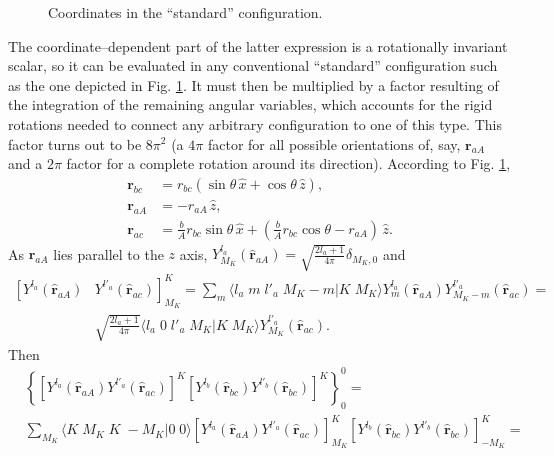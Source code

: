 \begin{subappendices}
\begin{figure}
\vspace{-3cm}
\caption{Coordinates in the ``standard'' configuration.}\label{figC6AppF2}
\end{figure}
The coordinate--dependent part of the latter expression is  a rotationally invariant scalar, so it can be evaluated in any conventional ``standard'' configuration such as the one depicted in Fig. \ref{figC6AppF2}. It must then be multiplied by a factor resulting of the integration of the remaining angular variables, which accounts for the rigid rotations needed to connect any arbitrary configuration to one of this type. This factor turns out to be $8\pi^2$ (a $4\pi$ factor for all possible orientations of, say, $\mathbf r_{aA}$ and a $2\pi$ factor for a complete rotation around its direction). According to Fig. \ref{figC6AppF2},
\begin{equation}\label{eqC6AppF22}
\begin{split}
\mathbf{r}_{bc}&=r_{bc}\left(\sin \theta\, \hat x+\cos \theta\,\hat z \right),\\
\mathbf{r}_{aA}&=-r_{aA}\,\hat z,\\
\mathbf{r}_{ac}&=\frac{b}{A}r_{bc}\sin \theta\,\hat x+\left(\frac{b}{A}r_{bc}\cos \theta-r_{aA}\right)\,\hat z.
\end{split}
\end{equation}
As $\mathbf{r}_{aA}$ lies parallel to the $z$ axis, $Y^{l_a}_{M_K} (\hat{\mathbf r}_{aA})=\sqrt{\frac{2l_a+1}{4\pi}}\delta_{M_K,0}$ and
\begin{equation}\label{eqC6AppG22}
\begin{split}
\left[ Y^{l_a} (\hat{\mathbf r}_{aA})\right.&\left. Y^{l'_a} (\hat{ \mathbf r}_{ac})\right]^K_{M_K}=\sum_{m}\langle l_a\;m\;l'_a\;M_K-m|K\;M_K\rangle Y^{l_a}_{m} (\hat{ \mathbf r}_{aA})Y^{l'_a}_{M_K-m} (\hat{ \mathbf r}_{ac})=\\
&\sqrt{\frac{2l_a+1}{4\pi}} \langle l_a\;0\;l'_a\;M_K|K\;M_K\rangle Y^{l'_a}_{M_K} (\hat{ \mathbf r}_{ac}).
\end{split}
\end{equation}
Then
\begin{equation}\label{eqC6AppG23}
\begin{split}
&\left\{\left[ Y^{l_a} (\hat{\mathbf r}_{aA}) Y^{l'_a} (\hat{ \mathbf r}_{ac})\right]^K\left[ Y^{l_b} (\hat{\mathbf r}_{bc}) Y^{l'_b} (\hat{\mathbf r}_{bc})\right]^{K} \right\}^0_0=\\
&\sum_{M_K}\langle K\;M_K\;K\;-M_K|0\;0\rangle \left[ Y^{l_a} (\hat{\mathbf r}_{aA}) Y^{l'_a} (\hat{ \mathbf r}_{ac})\right]^K_{M_K}\left[ Y^{l_b} (\hat{\mathbf r}_{bc}) Y^{l'_b} (\hat{\mathbf r}_{bc})\right]^{K}_{-M_K}=\\

\end{split}
\end{equation}
\end{subappendices}
